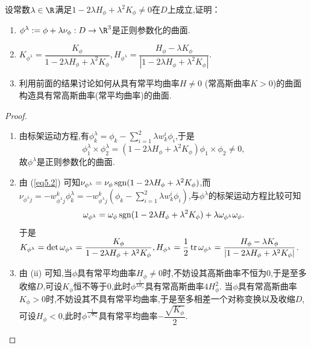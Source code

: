 	\begin{excise}
		设常数$\lambda\in \R$满足$1-2\lambda H_{\phi}+\lambda^{2}K_{\phi}\neq 0$在$D$上成立,证明：
		\begin{enumerate}[label=(\roman*)]
			\item $\phi^{\lambda}:=\phi+\lambda\nu_{\phi}:D\to \R^{3}$是正则参数化的曲面.
			\item\label{5.6.2} $K_{\phi^{\lambda}}=\dfrac{K_{\phi}}{1-2\lambda H_{\phi}+\lambda^{2}K_{\phi}},H_{\phi^{\lambda}}=\dfrac{H_{\phi}-\lambda K_{\phi}}{|1-2\lambda H_{\phi}+\lambda^{2}K_{\phi}|}.$
			\item 利用前面的结果讨论如何从具有常平均曲率$H\neq 0$ (常高斯曲率$K>0$)的曲面构造具有常高斯曲率(常平均曲率)的曲面.
		\end{enumerate}
	\end{excise}
	\begin{proof}
		\begin{enumerate}[label=(\roman*)]
			\item 由标架运动方程,有$\displaystyle \phi_{k}^{\lambda}=\phi_{k}-\sum_{i=1}^{2}\lambda w_{k}^{i}\phi_{i}$,于是
			\begin{equation}\label{eq5.2}
			\phi_{1}^{\lambda}\times \phi_{2}^{\lambda}=(1-2\lambda H_{\phi}+\lambda^{2}K_{\phi})\phi_{1}\times \phi_{2}\neq 0,
			\end{equation}
			故$\phi^{\lambda}$是正则参数化的曲面.
			\item 由 (\ref{eq5.2}) 可知$\nu_{\phi^{\lambda}}=\nu_{\phi}\operatorname{sgn}(1-2\lambda H_{\phi}+\lambda^{2}K_{\phi})$,而$\displaystyle \nu_{\phi^{\lambda}j}=-w_{\phi^{\lambda}j}^{k}\phi_{k}^{\lambda}=-w_{\phi^{\lambda}j}^{k}\left(\phi_{k}-\sum_{i=1}^{2}\lambda w_{k}^{i}\phi_{i}\right)$,与$\phi^{\lambda}$的标架运动方程比较可知
			$$
			\omega_{\phi^{\lambda}}=\omega_{\phi}\operatorname{sgn}(1-2\lambda H_{\phi}+\lambda^{2}K_{\phi})+\lambda\omega_{\phi^{\lambda}}\omega_{\phi}.
			$$
			于是$K_{\phi^{\lambda}}=\det\omega_{\phi^{\lambda}}=\dfrac{K_{\phi}}{1-2\lambda H_{\phi}+\lambda^{2}K_{\phi}},H_{\phi^{\lambda}}=\dfrac{1}{2}\operatorname{tr} \omega_{\phi^{\lambda}}=\dfrac{H_{\phi}-\lambda K_{\phi}}{|1-2\lambda H_{\phi}+\lambda^{2}K_{\phi}|}$.
			\item 由 (ii) 可知,当$\phi$具有常平均曲率$H_{\phi}\neq 0$时,不妨设其高斯曲率不恒为$0$,于是至多收缩$D$,可设$K_{\phi}$恒不等于$0$,此时$\phi^{\frac{1}{2H_{\phi}}}$具有常高斯曲率$4H_{\phi}^{2}$.
            当$\phi$具有常高斯曲率$K_{\phi}>0$时,不妨设其不具有常平均曲率,于是至多相差一个对称变换以及收缩$D$,可设$H_{\phi}<0$,此时$\phi^{\frac{1}{\sqrt{K_{\phi}}}}$具有常平均曲率$-\dfrac{\sqrt{K_{\phi}}}{2}$.\qedhere
		\end{enumerate}
	\end{proof}
